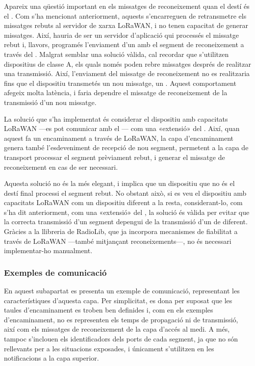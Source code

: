 \documentclass{tfgitic}[2024/07/01]
\begin{document}
{Apareix una qüestió important en els missatges de reconeixement quan el destí és el . Com s'ha mencionat anteriorment, aquests s'encarreguen de retransmetre els missatges rebuts al servidor de xarxa LoRaWAN, i no tenen capacitat de generar missatges. Així, hauria de ser un servidor d'aplicació qui processés el missatge rebut i, llavors, programés l'enviament d'un  amb el segment de reconeixement a través del .
Malgrat semblar una solució vàlida, cal recordar que s'utilitzen dispositius de classe A, els quals només poden rebre missatges després de realitzar una transmissió. Així, l'enviament del missatge de reconeixement no es realitzaria fins que el dispositiu transmetés un nou missatge, un . Aquest comportament afegeix molta latència, i faria dependre el missatge de reconeixement de la transmissió d'un nou missatge.

La solució que s'ha implementat és considerar el dispositiu amb capacitats LoRaWAN ---es pot comunicar amb el --- com una «extensió» del . Així, quan aquest fa un encaminament a través de LoRaWAN, la capa d'encaminament genera també l'esdeveniment de recepció de nou segment, permetent a la capa de transport processar el segment prèviament rebut, i generar el missatge de reconeixement en cas de ser necessari.

Aquesta solució no és la més elegant, i implica que un dispositiu que no és el destí final processi el segment rebut. No obstant això, si es veu el dispositiu amb capacitats LoRaWAN com un dispositiu diferent a la resta, considerant-lo, com s'ha dit anteriorment, com una «extensió» del , la solució és vàlida per evitar que la correcta transmissió d'un segment depengui de la transmissió d'un de diferent. Gràcies a la llibreria de RadioLib, que ja incorpora mecanismes de fiabilitat a través de LoRaWAN ---també mitjançant reconeixements---, no és necessari implementar-ho manualment.

\subsubsection{Exemples de comunicació}
En aquest subapartat es presenta un exemple de comunicació, representant les característiques d'aquesta capa. Per simplicitat, es dona per suposat que les taules d'encaminament es troben ben definides i, com en els exemples d'encaminament, no es representen els temps de propagació ni de transmissió, així com els missatges de reconeixement de la capa d'accés al medi. A més, tampoc s'inclouen els identificadors dels ports de cada segment, ja que no són rellevants per a les situacions exposades, i únicament s'utilitzen en les notificacions a la capa superior.

}
\end{document}
